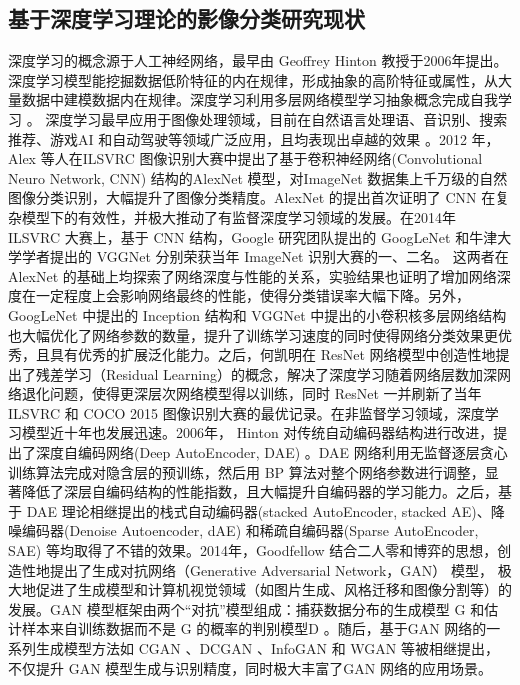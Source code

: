 \subsection{基于深度学习理论的影像分类研究现状}
\label{subsec:1-2-2}
深度学习的概念源于人工神经网络，最早由 Geoffrey Hinton \cite{hinton2006fast} 教授于2006年提出。深度学习模型能挖掘数据低阶特征的内在规律，形成抽象的高阶特征或属性，从大量数据中建模数据内在规律。深度学习利用多层网络模型学习抽象概念完成自我学习 \cite{lecun2015deep}。 深度学习最早应用于图像处理领域，目前在自然语言处理语、音识别、搜索推荐、游戏AI 和自动驾驶等领域广泛应用，且均表现出卓越的效果 \cite{bengio2009learning}。2012 年，Alex 等人在ILSVRC 图像识别大赛中提出了基于卷积神经网络(Convolutional Neuro Network, CNN) 结构的AlexNet \cite{NIPS2012_4824} 模型，对ImageNet 数据集上千万级的自然图像分类识别，大幅提升了图像分类精度。AlexNet 的提出首次证明了 CNN 在复杂模型下的有效性，并极大推动了有监督深度学习领域的发展。在2014年 ILSVRC 大赛上，基于 CNN 结构，Google 研究团队提出的 GoogLeNet \cite{szegedy2015going} 和牛津大学学者提出的 VGGNet \cite{simonyan2014very} 分别荣获当年 ImageNet 识别大赛的一、二名。 这两者在 AlexNet 的基础上均探索了网络深度与性能的关系，实验结果也证明了增加网络深度在一定程度上会影响网络最终的性能，使得分类错误率大幅下降。另外，GoogLeNet 中提出的 Inception 结构和 VGGNet 中提出的小卷积核多层网络结构也大幅优化了网络参数的数量，提升了训练学习速度的同时使得网络分类效果更优秀，且具有优秀的扩展泛化能力。之后，何凯明在 ResNet \cite{he2016deep} 网络模型中创造性地提出了残差学习（Residual Learning）的概念，解决了深度学习随着网络层数加深网络退化问题，使得更深层次网络模型得以训练，同时 ResNet 一并刷新了当年 ILSVRC 和 COCO 2015 图像识别大赛的最优记录。在非监督学习领域，深度学习模型近十年也发展迅速。2006年， Hinton 对传统自动编码器结构进行改进，提出了深度自编码网络(Deep AutoEncoder, DAE) \cite{hinton2006fast}。DAE 网络利用无监督逐层贪心训练算法完成对隐含层的预训练，然后用 BP 算法对整个网络参数进行调整，显著降低了深层自编码结构的性能指数，且大幅提升自编码器的学习能力。之后，基于 DAE 理论相继提出的栈式自动编码器(stacked AutoEncoder, stacked AE)\cite{bengio2007greedy}、降噪编码器(Denoise Autoencoder, dAE)\cite{vincent2008extracting} 和稀疏自编码器(Sparse AutoEncoder, SAE)\cite{ng2011sparse} 等均取得了不错的效果。2014年，Goodfellow 结合二人零和博弈的思想，创造性地提出了生成对抗网络（Generative Adversarial Network，GAN）\cite{goodfellow2014generative} 模型， 极大地促进了生成模型和计算机视觉领域（如图片生成、风格迁移和图像分割等）的发展。GAN 模型框架由两个“对抗”模型组成：捕获数据分布的生成模型 G 和估计样本来自训练数据而不是 G 的概率的判别模型D 。随后，基于GAN 网络的一系列生成模型方法如 CGAN\cite{mirza2014conditional} 、DCGAN \cite{radford2015unsupervised} 、InfoGAN \cite{chen2016infogan} 和 WGAN \cite{arjovsky2017wasserstein} 等被相继提出，不仅提升 GAN 模型生成与识别精度，同时极大丰富了GAN 网络的应用场景。

